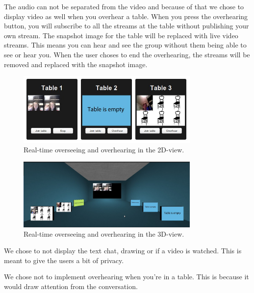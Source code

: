 \documentclass[12pt, titlepage]{article}
\begin{document}
The audio can not be separated from the video and because of that we chose to display video as well when you overhear a table. When you press the overhearing button, you will subscribe to all the streams at the table without publishing your own stream. The snapshot image for the table will be replaced with live video streams. This means you can hear and see the group without them being able to see or hear you. When the user choses to end the overhearing, the streams will be removed and replaced with the snapshot image.
\begin{figure}[H]
  \centering
	\includegraphics[width=0.8\textwidth,keepaspectratio]{overhear2d.jpg}
  \caption{Real-time overseeing and overhearing in the 2D-view.}
\end{figure}
\begin{figure}[H]
  \centering
	\includegraphics[width=0.8\textwidth,keepaspectratio]{3doverhearing.jpg}
  \caption{Real-time overseeing and overhearing in the 3D-view.}
\end{figure}
We chose to not display the text chat, drawing or if a video is watched. This is meant to give the users a bit of privacy. 

We chose not to implement overhearing when you're in a table. This is because it would draw attention from the conversation.
\end{document}
